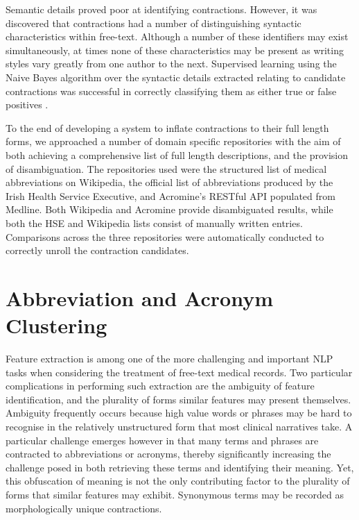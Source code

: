 Semantic details proved poor at identifying contractions. However, it was discovered that contractions had a number of distinguishing syntactic characteristics within free-text. Although a number of these identifiers may exist simultaneously, at times none of these characteristics may be present as writing styles vary greatly from one author to the next. Supervised learning using the Naive Bayes algorithm over the syntactic details extracted relating to candidate contractions was successful in correctly classifying them as either true or false positives \cite{wallace2017abbrev}.

To the end of developing a system to inflate contractions to their full length forms, we approached a
number of domain specific repositories with the aim of both achieving a comprehensive list of full length descriptions, and the provision of disambiguation. The repositories used were the structured list of medical abbreviations on Wikipedia, the official list of abbreviations produced by the Irish Health Service Executive, and Acromine's RESTful API \cite{okanohara2006improving} populated from Medline. Both Wikipedia and Acromine provide disambiguated results, while both the HSE and Wikipedia lists consist of manually written entries. Comparisons across the three repositories were automatically conducted to correctly unroll the contraction candidates. 


\section{Abbreviation and Acronym Clustering}
\label{section:abbreviations&acronyms}

Feature extraction is among one of the more challenging and important NLP tasks when considering the treatment of free-text medical records. Two particular complications in performing such extraction are the ambiguity of feature identification, and the plurality of forms similar features may present themselves. Ambiguity frequently occurs because high value words or phrases may be hard to recognise in the relatively unstructured form that most clinical narratives take. A particular challenge emerges however in that many terms and phrases are contracted to abbreviations or acronyms, thereby significantly increasing the challenge posed in both retrieving these terms and identifying their meaning. Yet, this obfuscation of meaning is not the only contributing factor to the plurality of forms that similar features may exhibit. Synonymous terms may be recorded as morphologically unique contractions.

